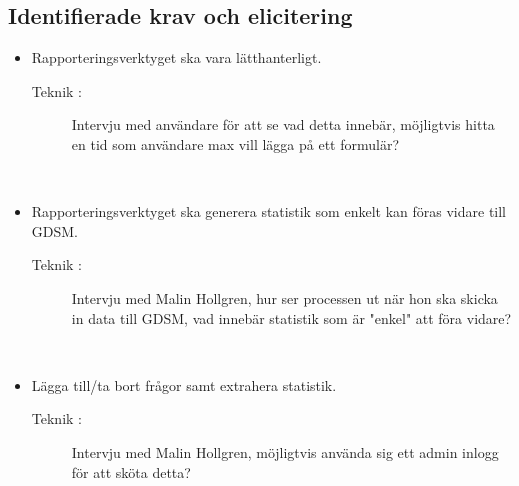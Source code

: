 \documentclass{article}
\begin{document}
        \subsection{Identifierade krav och elicitering}
            \begin{itemize}
                \item Rapporteringsverktyget ska vara lätthanterligt.
                    \begin{description}
                        \item[Teknik :]Intervju med användare för att se vad detta innebär, möjligtvis hitta en tid som användare max vill lägga på ett formulär?
                    \end{description}
                    \\
            \item Rapporteringsverktyget ska generera statistik som enkelt kan föras vidare till GDSM.
                    \begin{description}
                        \item[Teknik :]Intervju med Malin Hollgren, hur ser processen ut när hon ska skicka in data till GDSM, vad innebär statistik som är "enkel" att föra vidare?
                    \end{description}
                    \\
             \item Lägga till/ta bort frågor samt extrahera statistik.
                    \begin{description}
                        \item[Teknik :]Intervju med Malin Hollgren, möjligtvis använda sig ett admin inlogg för att sköta detta?
                    \end{description}
                

\end{itemize}
\end{document}
